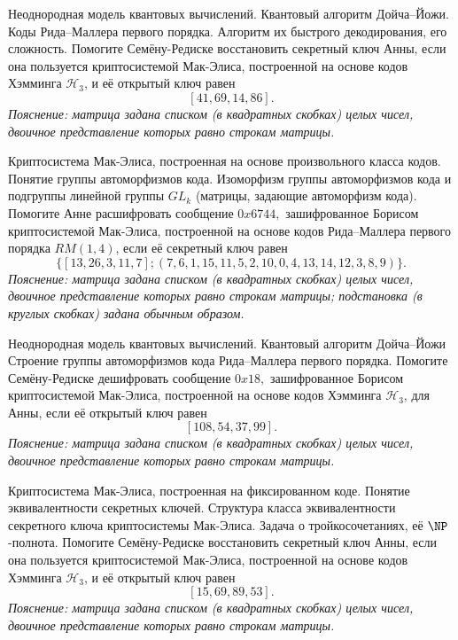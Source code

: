 \begin{questions}
    \question
        Неоднородная модель квантовых вычислений. Квантовый алгоритм Дойча--Йожи.
    \question
        Коды Рида--Маллера первого порядка.
        Алгоритм их быстрого декодирования, его сложность.
    \question
        Помогите Семёну-Редиске восстановить секретный ключ Анны, если она пользуется криптосистемой Мак-Элиса, построенной на основе кодов Хэмминга \(\mathcal{H}_3\), и её открытый ключ равен 
        \[[41, 69, 14, 86].\]
        \emph{Пояснение: матрица задана списком (в квадратных скобках) целых чисел, двоичное представление которых равно строкам матрицы.}
\end{questions}


\begin{questions}
    \question
        Криптосистема Мак-Элиса, построенная на основе произвольного класса кодов.
    \question
        Понятие группы автоморфизмов кода.
        Изоморфизм группы автоморфизмов кода и подгруппы линейной группы \(GL_k\) (матрицы, задающие автоморфизм кода).
    \question
        Помогите Анне расшифровать сообщение \(0x6744,\) зашифрованное Борисом криптосистемой Мак-Элиса, построенной на основе кодов Рида--Маллера первого порядка \(RM(1,4)\), если её секретный ключ равен \[\{[13, 26, 3, 11, 7]; (7, 6, 1, 15, 11, 5, 2, 10, 0, 4, 13, 14, 12, 3, 8, 9)\}.\]
        \emph{Пояснение: матрица задана списком (в квадратных скобках) целых чисел, двоичное представление которых равно строкам матрицы; подстановка (в круглых скобках) задана обычным образом.}
\end{questions}


\begin{questions}
    \question
        Неоднородная модель квантовых вычислений. Квантовый алгоритм Дойча--Йожи
    \question
        Строение группы автоморфизмов кода Рида--Маллера первого порядка.
    \question
        Помогите Семёну-Редиске дешифровать сообщение \(0x18,\) зашифрованное Борисом криптосистемой Мак-Элиса, построенной на основе кодов Хэмминга \(\mathcal{H}_3\), для Анны, если её открытый ключ равен 
        \[[108, 54, 37, 99].\]
        \emph{Пояснение: матрица задана списком (в квадратных скобках) целых чисел, двоичное представление которых равно строкам матрицы.}
\end{questions}


\begin{questions}
    \question
        Криптосистема Мак-Элиса, построенная на фиксированном коде.
        Понятие эквивалентности секретных ключей.
        Структура класса эквивалентности секретного ключа криптосистемы Мак-Элиса.
    \question
        Задача о тройкосочетаниях, её \(\NP\)-полнота.
    \question
        Помогите Семёну-Редиске восстановить секретный ключ Анны, если она пользуется криптосистемой Мак-Элиса, построенной на основе кодов Хэмминга \(\mathcal{H}_3\), и её открытый ключ равен 
        \[[15, 69, 89, 53].\]
        \emph{Пояснение: матрица задана списком (в квадратных скобках) целых чисел, двоичное представление которых равно строкам матрицы.}
\end{questions}


